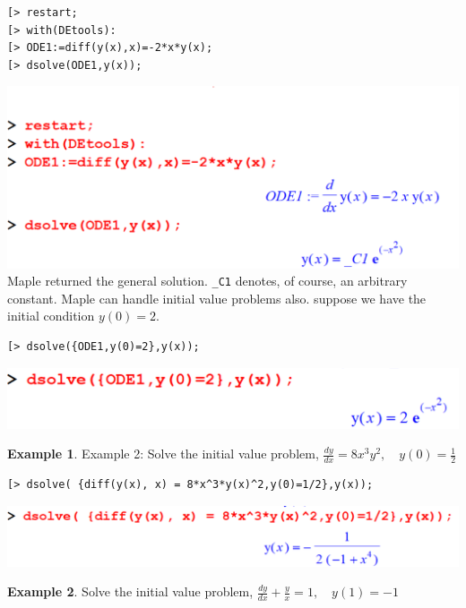 \documentclass[
]{book}
\theoremstyle{definition}
\theoremstyle{definition}
\newtheorem{example}{Example}[chapter]
\theoremstyle{definition}
\theoremstyle{definition}
\theoremstyle{remark}
\begin{document}
\begin{verbatim}
[> restart; 
[> with(DEtools):
[> ODE1:=diff(y(x),x)=-2*x*y(x);
[> dsolve(ODE1,y(x));
\end{verbatim}

\includegraphics{figures/Diff/Diff 6.2 -6.png}
Maple returned the general solution. \texttt{\_C1} denotes, of course, an arbitrary constant.
Maple can handle initial value problems also. suppose we have the initial condition \(y(0)=2\).

\begin{verbatim}
[> dsolve({ODE1,y(0)=2},y(x));
\end{verbatim}

\includegraphics{figures/Diff/Diff 6.2 -7.png}

\begin{example}
\protect\hypertarget{exm:unnamed-chunk-49}{}\label{exm:unnamed-chunk-49}Example 2: Solve the initial value problem,
\(\frac{dy}{dx} = 8x^3y^2, \quad y(0) = \frac{1}{2}\)
\end{example}

\begin{verbatim}
[> dsolve( {diff(y(x), x) = 8*x^3*y(x)^2,y(0)=1/2},y(x));
\end{verbatim}

\includegraphics{figures/Diff/Diff 6.2 -8.png}

\begin{example}
\protect\hypertarget{exm:unnamed-chunk-50}{}\label{exm:unnamed-chunk-50}Solve the initial value problem, \(\frac{dy}{dx} + \frac{y}{x} = 1, \quad y(1) = -1\)
\end{example}
\end{document}
